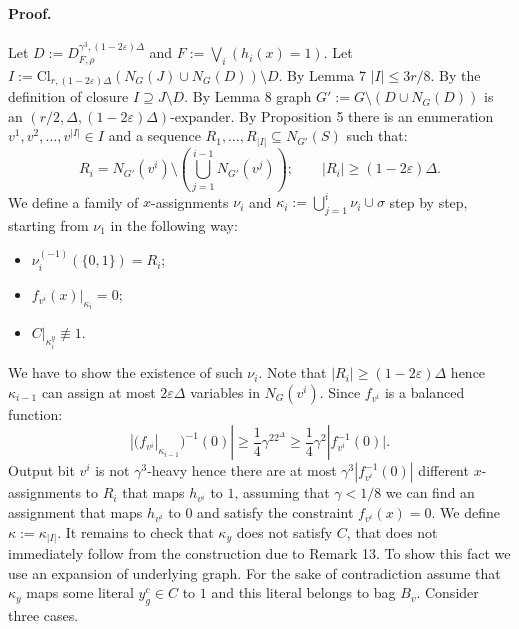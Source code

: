 \documentclass[10pt,a4paper]{article}
\begin{document}
\paragraph{Proof.} Let $D:=D_{F,\rho}^{\gamma^3,(1-2\varepsilon)\Delta}$ and $F:=\bigvee_i(h_i(x)=1)$. Let $I:=\mathrm{Cl}_{r,(1-2\varepsilon)\Delta}(N_G(J)\cup N_G(D))\setminus D$. By Lemma 7 $|I|\leq3r/8$. By the definition of closure $I\supseteq J\setminus D$.
By Lemma 8 graph $G':=G\setminus(D\cup N_G(D))$ is an $(r/2,\Delta,(1-2\varepsilon)\Delta)$-expander. By Proposition 5 there is an enumeration $v^1,v^2,\ldots,v^{|I|}\in I$ and a sequence $R_1,\ldots,R_{|I|}\subseteq N_{G'}(S)$ such that:
\[R_i=N_{G'}(v^i)\setminus\left(\bigcup_{j=1}^{i-1}N_{G'}(v^j)\right);\qquad|R_i|\geq(1-2\varepsilon)\Delta.\]
We define a family of $x$-assignments $\nu_i$ and $\kappa_i:=\bigcup_{j=1}^i\nu_i\cup\sigma$ step by step, starting from $\nu_1$ in the following way:
\begin{itemize}
\item $\nu_i^{(-1)}(\{0,1\})=R_i$;
\item $f_{v^i}(x)|_{\kappa_i}=0$;
\item $C|_{\kappa_i^y}\not\equiv1$.
\end{itemize}
We have to show the existence of such $\nu_i$. Note that $|R_i|\geq(1-2\varepsilon)\Delta$ hence $\kappa_{i-1}$ can assign at most $2\varepsilon\Delta$ variables in $N_G(v^i)$. Since $f_{v^i}$ is a balanced function:
\[|(f_{v^i}|_{\kappa_{i-1}})^{-1}(0)|\geq\frac14\gamma^22^\Delta\geq\frac14\gamma^2|f_{v^i}^{-1}(0)|.\]
Output bit $v^i$ is not $\gamma^3$-heavy hence there are at most $\gamma^3|f_{v^i}^{-1}(0)|$ different $x$-assignments to $R_i$ that maps $h_{v^i}$ to $1$, assuming that $\gamma<1/8$ we can find an assignment that maps $h_{v^i}$ to $0$ and satisfy the constraint $f_{v^i}(x)=0$. We define $\kappa:=\kappa_{|I|}$.
It remains to check that $\kappa_y$ does not satisfy $C$, that does not immediately follow from the construction due to Remark 13. To show this fact we use an expansion of underlying graph. For the sake of contradiction assume that $\kappa_y$ maps some literal $y_g^c\in C$ to $1$ and this literal belongs to bag $B_v$. Consider three cases.
\end{document}
